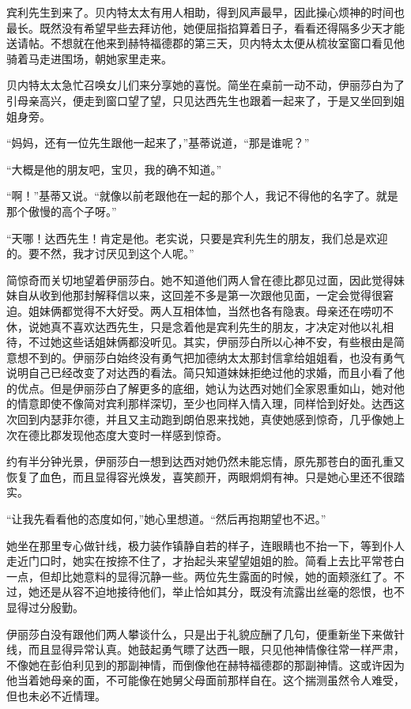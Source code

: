 \par 宾利先生到来了。贝内特太太有用人相助，得到风声最早，因此操心烦神的时间也最长。既然没有希望早些去拜访他，她便屈指掐算着日子，看看还得隔多少天才能送请帖。不想就在他来到赫特福德郡的第三天，贝内特太太便从梳妆室窗口看见他骑着马走进围场，朝她家里走来。
\par 贝内特太太急忙召唤女儿们来分享她的喜悦。简坐在桌前一动不动，伊丽莎白为了引母亲高兴，便走到窗口望了望，只见达西先生也跟着一起来了，于是又坐回到姐姐身旁。
\par “妈妈，还有一位先生跟他一起来了，”基蒂说道，“那是谁呢？”
\par “大概是他的朋友吧，宝贝，我的确不知道。”
\par “啊！”基蒂又说。“就像以前老跟他在一起的那个人，我记不得他的名字了。就是那个傲慢的高个子呀。”
\par “天哪！达西先生！肯定是他。老实说，只要是宾利先生的朋友，我们总是欢迎的。要不然，我才讨厌见到这个人呢。”
\par 简惊奇而关切地望着伊丽莎白。她不知道他们两人曾在德比郡见过面，因此觉得妹妹自从收到他那封解释信以来，这回差不多是第一次跟他见面，一定会觉得很窘迫。姐妹俩都觉得不大好受。两人互相体恤，当然也各有隐衷。母亲还在唠叨不休，说她真不喜欢达西先生，只是念着他是宾利先生的朋友，才决定对他以礼相待，不过她这些话姐妹俩都没听见。其实，伊丽莎白所以心神不安，有些根由是简意想不到的。伊丽莎白始终没有勇气把加德纳太太那封信拿给姐姐看，也没有勇气说明自己已经改变了对达西的看法。简只知道妹妹拒绝过他的求婚，而且小看了他的优点。但是伊丽莎白了解更多的底细，她认为达西对她们全家恩重如山，她对他的情意即使不像简对宾利那样深切，至少也同样入情入理，同样恰到好处。达西这次回到内瑟菲尔德，并且又主动跑到朗伯恩来找她，真使她感到惊奇，几乎像她上次在德比郡发现他态度大变时一样感到惊奇。
\par 约有半分钟光景，伊丽莎白一想到达西对她仍然未能忘情，原先那苍白的面孔重又恢复了血色，而且显得容光焕发，喜笑颜开，两眼炯炯有神。只是她心里还不很踏实。
\par “让我先看看他的态度如何，”她心里想道。“然后再抱期望也不迟。”
\par 她坐在那里专心做针线，极力装作镇静自若的样子，连眼睛也不抬一下，等到仆人走近门口时，她实在按捺不住了，才抬起头来望望姐姐的脸。简看上去比平常苍白一点，但却比她意料的显得沉静一些。两位先生露面的时候，她的面颊涨红了。不过，她还是从容不迫地接待他们，举止恰如其分，既没有流露出丝毫的怨恨，也不显得过分殷勤。
\par 伊丽莎白没有跟他们两人攀谈什么，只是出于礼貌应酬了几句，便重新坐下来做针线，而且显得异常认真。她鼓起勇气瞟了达西一眼，只见他神情像往常一样严肃，不像她在彭伯利见到的那副神情，而倒像他在赫特福德郡的那副神情。这或许因为他当着她母亲的面，不可能像在她舅父母面前那样自在。这个揣测虽然令人难受，但也未必不近情理。
